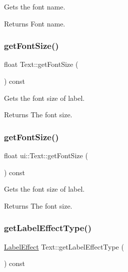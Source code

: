 Gets the font name.

\begin{DoxyReturn}{Returns}
Font name. 
\end{DoxyReturn}
\mbox{\label{classui_1_1Text_a6e799a9b0ba6f88e704eea12599d3d5c}} 
\subsubsection{\texorpdfstring{get\+Font\+Size()}{getFontSize()}\hspace{0.1cm}{\footnotesize\ttfamily [1/2]}}
{\footnotesize\ttfamily float Text\+::get\+Font\+Size (\begin{DoxyParamCaption}{ }\end{DoxyParamCaption}) const}

Gets the font size of label.

\begin{DoxyReturn}{Returns}
The font size. 
\end{DoxyReturn}
\mbox{\label{classui_1_1Text_a009d2ccada317ece8824fe3ad553f309}} 
\subsubsection{\texorpdfstring{get\+Font\+Size()}{getFontSize()}\hspace{0.1cm}{\footnotesize\ttfamily [2/2]}}
{\footnotesize\ttfamily float ui\+::\+Text\+::get\+Font\+Size (\begin{DoxyParamCaption}{ }\end{DoxyParamCaption}) const}

Gets the font size of label.

\begin{DoxyReturn}{Returns}
The font size. 
\end{DoxyReturn}
\mbox{\label{classui_1_1Text_a48bc2818885677b1b58ce5faf860bf24}} 
\subsubsection{\texorpdfstring{get\+Label\+Effect\+Type()}{getLabelEffectType()}\hspace{0.1cm}{\footnotesize\ttfamily [1/2]}}
{\footnotesize\ttfamily \hyperlink{group__base_ga26fd049ca5303e0cf4435208058f32e4}{Label\+Effect} Text\+::get\+Label\+Effect\+Type (\begin{DoxyParamCaption}{ }\end{DoxyParamCaption}) const}

